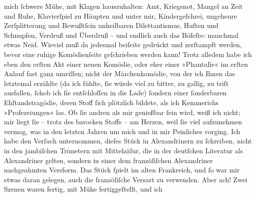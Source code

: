 \begin{ledgroupsized}[t]{13cm}
               mich ſchwere Mühe, mit Klagen hauszuhalten: Amt, Kriegs{\pb}not, Mangel an Zeit und Ruhe, Klavierſpiel zu Häupten und unter mir,
               Kindergeſchrei, ungeheure Zerſplitterung und Bewußtſein unheilbaren Dilettantismus,
               Huſten und Schnupfen, Verdruß und Überdruß – und endlich auch das Böſeſte: manchmal
               etwas Neid. Wieviel muß da jedesmal beiſeite gedrückt und zerſtampft werden, bevor
               eine ruhige Komödienſeite geſchrieben werden kann!\pend
           \pstart
           Trotz alledem habe ich eben den erſten Akt einer neuen Komödie, oder eher einer
               »Phantaſie« im erſten Anlauf fast ganz umriſſen; nicht der Märchenkomödie, von der ich Ihnen das
               letztemal erzählte (da ich fühlte, ſie würde viel zu bitter, zu gallig, zu triſt
               ausfallen, ſchob ich ſie entſchloſſen in die Lade) ſondern einer ſonderbaren Ehſtandstragödie, deren Stoff
               ſich plötzlich bildete, als ich Kemmerichs
                  »Profezeiungen« las. Ob ſie andren als mir
               genießbar ſein wird, weiß ich nicht; mir liegt ſie – trotz des ba{\pb}rocken Stoffs – am Herzen, weil ſie viel aufzunehmen
               vermag, was in den letzten Jahren um mich und in mir Peinliches vorging.\pend
           \pstart
           Ich habe den Verſuch unternommen, dieſes Stück in Alexandrinern zu ſchreiben, nicht
               in den jambiſchen Trimetern mit Mittelzäſur, die in der deutſchen Literatur als
               Alexandriner gelten, sondern in einer dem franzöſiſchen Alexandriner nachgeahmten Versform. Das Stück ſpielt im alten
                  Frankreich, und ſo war mir etwas daran
               gelegen, auch die franzöſiſche Versart zu
               verwenden. Aber ach! Zwei Szenen waren fertig, mit Mühe fertiggeſtellt, und ich

\end{ledgroupsized}
